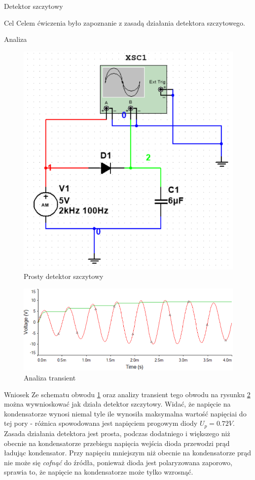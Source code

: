 \documentclass[a4paper]{scrartcl}
\begin{document}
	\begin{section}{Detektor szczytowy}
		\begin{subsection}{Cel}
			Celem ćwiczenia było zapoznanie z zasadą działania detektora szczytowego.
		\end{subsection}
		\begin{subsection}{Analiza}
				\begin{figure}[ht]
				\begin{center}
					\includegraphics[width=0.4\linewidth]{exercise-4-circuit}
					\caption{Prosty detektor szczytowy}
					\label{fig:circuit-4}
				\end{center}
				\end{figure}

				\begin{figure}[!ht]
				\begin{center}
					\includegraphics[width=\linewidth]{exercise-4-transient}
					\caption{Analiza transient}
					\label{fig:exercise-4-transient}
				\end{center}
				\end{figure}
		\end{subsection}
		\begin{subsection}{Wniosek}
			Ze schematu obwodu \ref{fig:circuit-4} oraz analizy transient tego obwodu na rysunku \ref{fig:exercise-4-transient} można wywnioskować jak działa detektor szczytowy. Widać, że napięcie na kondensatorze wynosi niemal tyle ile wynosiła maksymalna wartość napięciai do tej pory - różnica spowodowana jest napięciem progowym diody $ U_{p} = 0.72V $. Zasada działania detektora jest prosta, podczas dodatniego i większego niż obecnie na kondensatorze przebiegu napięcia wejścia dioda przewodzi prąd ładując kondensator. Przy napięciu mniejszym niż obecnie na kondensatorze prąd nie może się \textit{cofnąć} do źródła, ponieważ dioda jest polaryzowana zaporowo, sprawia to, że napięcie na kondensatorze może tylko wzrosnąć.
		\end{subsection}
	\end{section}
\end{document}
